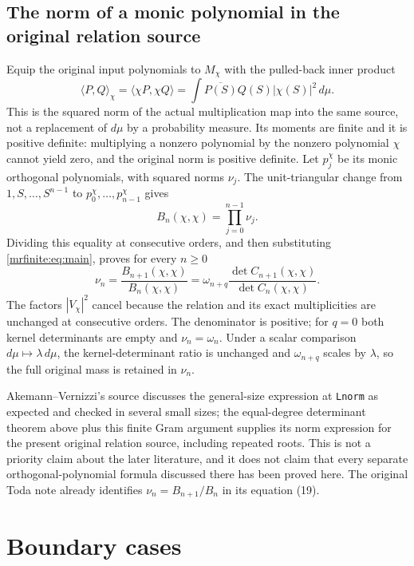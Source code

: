 \documentclass[11pt]{article}
\begin{document}
\subsection{The norm of a monic polynomial in the original relation source}
\label{mrfinite:sec:relationnorm}

Equip the original input polynomials to \(M_\chi\) with the pulled-back
inner product
\[
 \langle P,Q\rangle_\chi=\langle\chi P,\chi Q\rangle
 =\int\overline{P(S)}Q(S)|\chi(S)|^2\,d\mu.
\]
This is the squared norm of the actual multiplication map into the same
source, not a replacement of \(d\mu\) by a probability measure. Its
moments are finite and it is positive definite: multiplying a nonzero
polynomial by the nonzero polynomial \(\chi\) cannot yield zero, and
the original norm is positive definite. Let \(p_j^\chi\) be its monic
orthogonal polynomials, with squared norms \(\nu_j\).
The unit-triangular change from \(1,S,\ldots,S^{n-1}\) to
\(p_0^\chi,\ldots,p_{n-1}^\chi\) gives
\[
 B_n(\chi,\chi)=\prod_{j=0}^{n-1}\nu_j.
\]
Dividing this equality at consecutive orders, and then substituting
\eqref{mrfinite:eq:main}, proves for every \(n\geq0\)
\begin{equation}\label{mrfinite:eq:relationnorm}
 \boxed{\nu_n=\frac{B_{n+1}(\chi,\chi)}{B_n(\chi,\chi)}
       =\omega_{n+q}
          \frac{\det C_{n+1}(\chi,\chi)}
               {\det C_n(\chi,\chi)}.}
\end{equation}
The factors \(|V_\chi|^2\) cancel because the relation and its exact
multiplicities are unchanged at consecutive orders. The denominator
is positive; for \(q=0\) both kernel determinants are empty and
\(\nu_n=\omega_n\). Under a scalar comparison
\(d\mu\mapsto\lambda\,d\mu\), the kernel-determinant ratio is
unchanged and \(\omega_{n+q}\) scales by \(\lambda\), so the full
original mass is retained in \(\nu_n\).

Akemann--Vernizzi's source discusses the general-size expression at
\texttt{Lnorm} as expected and checked in several small sizes; the
equal-degree determinant theorem above plus this finite Gram argument
supplies its norm expression for the present original relation source,
including repeated roots. This is not a priority claim about the later
literature, and it does not claim that every separate orthogonal-polynomial
formula discussed there has been proved here. The original Toda note
already identifies \(\nu_n=B_{n+1}/B_n\) in its equation (19).

\section{Boundary cases}\label{mrfinite:sec:boundary}
\end{document}
